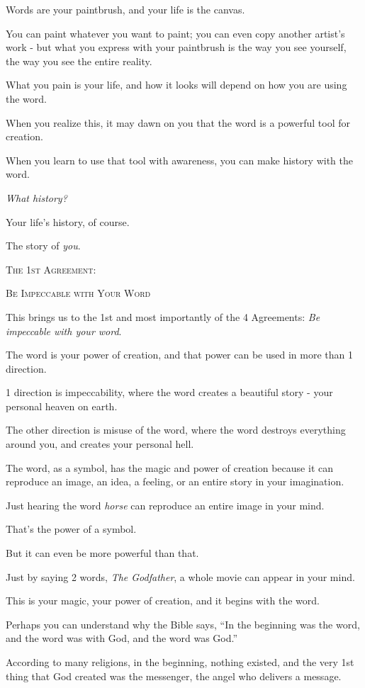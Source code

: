 \documentclass{article}
\numberwithin{equation}{section}
\begin{document}
Words are your paintbrush, and your life is the canvas.

You can paint whatever you want to paint; you can even copy another artist's work - but what you express with your paintbrush is the way you see yourself, the way you see the entire reality.

What you pain is your life, and how it looks will depend on how you are using the word.

When you realize this, it may dawn on you that the word is a powerful tool for creation.

When you learn to use that tool with awareness, you can make history with the word.

\textit{What history?}

Your life's history, of course.

The story of \textit{you}.
\begin{center}
    \textsc{The 1st Agreement}:
    
    \textsc{Be Impeccable with Your Word}
\end{center}
This brings us to the 1st and most importantly of the 4 Agreements: \textit{Be impeccable with your word}.

The word is your power of creation, and that power can be used in more than 1 direction.

1 direction is impeccability, where the word creates a beautiful story - your personal heaven on earth.

The other direction is misuse of the word, where the word destroys everything around you, and creates your personal hell.

%
The word, as a symbol, has the magic and power of creation because it can reproduce an image, an idea, a feeling, or an entire story in your imagination.

Just hearing the word \textit{horse} can reproduce an entire image in your mind.

That's the power of a symbol.

But it can even be more powerful than that.

Just by saying 2 words, \textit{The Godfather}, a whole movie can appear in your mind.

This is your magic, your power of creation, and it begins with the word.

%
Perhaps you can understand why the Bible says, ``In the beginning was the word, and the word was with God, and the word was God.''

According to many religions, in the beginning, nothing existed, and the very 1st thing that God created was the messenger, the angel who delivers a message.
\end{document}
